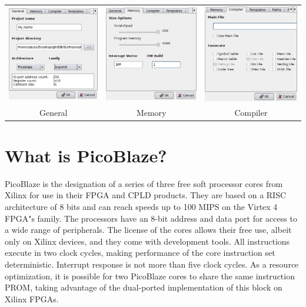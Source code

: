     \begin{table}[h!]
        \begin{tabular}{ccc}
            \includegraphics[width=.33\textwidth]{img/NewImg/project_1.png}
                &
            \includegraphics[width=.33\textwidth]{img/NewImg/project_2.png}
                &
            \includegraphics[width=.33\textwidth]{img/NewImg/project_3.png}
                \\
            General & Memory & Compiler
        \end{tabular}
    \end{table}

\section{What is PicoBlaze?}
    PicoBlaze is the designation of a series of three free soft processor cores from Xilinx for use in their FPGA and CPLD products. They are based on a RISC architecture of 8 bits and can reach speeds up to 100 MIPS on the Virtex 4 FPGA"s family. The processors have an 8-bit address and data port for access to a wide range of peripherals. The license of the cores allows their free use, albeit only on Xilinx devices, and they come with development tools.
    All instructions execute in two clock cycles, making performance of the core instruction set deterministic. Interrupt response is not more than five clock cycles. As a resource optimization, it is possible for two PicoBlaze cores to share the same instruction PROM, taking advantage of the dual-ported implementation of this block on Xilinx FPGAs.

